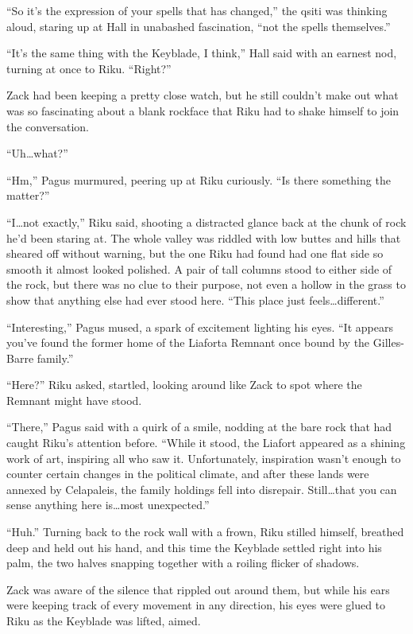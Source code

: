 ``So it's the expression of your spells that has changed,'' the qsiti was thinking aloud, staring up at Hall in unabashed fascination, ``not the spells themselves.''

``It's the same thing with the Keyblade, I think,'' Hall said with an earnest nod, turning at once to Riku. ``Right?''

Zack had been keeping a pretty close watch, but he still couldn't make out what was so fascinating about a blank rockface that Riku had to shake himself to join the conversation.

``Uh\ldots what?''

``Hm,'' Pagus murmured, peering up at Riku curiously. ``Is there something the matter?''

``I\ldots not exactly,'' Riku said, shooting a distracted glance back at the chunk of rock he'd been staring at. The whole valley was riddled with low buttes and hills that sheared off without warning, but the one Riku had found had one flat side so smooth it almost looked polished. A pair of tall columns stood to either side of the rock, but there was no clue to their purpose, not even a hollow in the grass to show that anything else had ever stood here. ``This place just feels\ldots different.''

``Interesting,'' Pagus mused, a spark of excitement lighting his eyes. ``It appears you've found the former home of the Liafort\textemdash a Remnant once bound by the Gilles-Barre family.''

``Here?'' Riku asked, startled, looking around like Zack to spot where the Remnant might have stood.

``There,'' Pagus said with a quirk of a smile, nodding at the bare rock that had caught Riku's attention before. ``While it stood, the Liafort appeared as a shining work of art, inspiring all who saw it. Unfortunately, inspiration wasn't enough to counter certain changes in the political climate, and after these lands were annexed by Celapaleis, the family holdings fell into disrepair. Still\ldots that you can sense anything here is\ldots most unexpected.''

``Huh.'' Turning back to the rock wall with a frown, Riku stilled himself, breathed deep and held out his hand, and this time the Keyblade settled right into his palm, the two halves snapping together with a roiling flicker of shadows.

Zack was aware of the silence that rippled out around them, but while his ears were keeping track of every movement in any direction, his eyes were glued to Riku as the Keyblade was lifted, aimed.

